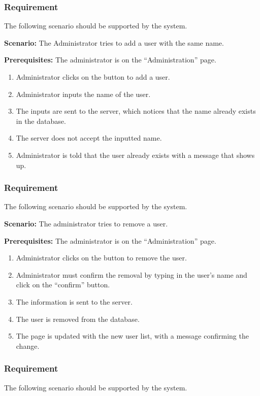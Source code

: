 \documentclass{article}
\begin{document}
\subsubsection{Requirement}
The following scenario should be supported by the system.

\textbf{Scenario:} The Administrator tries to add a user with the same name.

\textbf{Prerequisites:} The administrator is on the “Administration” page.

\begin{enumerate}
    \item Administrator clicks on the button to add a user.
    \item Administrator inputs the name of the user.
    \item The inputs are sent to the server, which notices that the name already exists in the database.
    \item The server does not accept the inputted name.
    \item Administrator is told that the user already exists with a message that shows up.
\end{enumerate}

\subsubsection{Requirement}
The following scenario should be supported by the system.

\textbf{Scenario:} The administrator tries to remove a user.

\textbf{Prerequisites:} The administrator is on the “Administration” page.

\begin{enumerate}
    \item Administrator clicks on the button to remove the user.
    \item Administrator must confirm the removal by typing in the user’s name and click on the “confirm” button.
    \item The information is sent to the server.
    \item The user is removed from the database.
    \item The page is updated with the new user list, with a message confirming the change.
\end{enumerate}


\subsubsection{Requirement}
The following scenario should be supported by the system.
\end{document}

